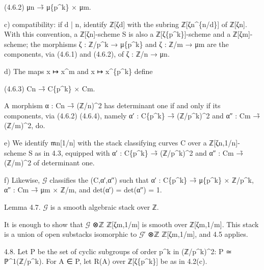 \documentclass[11pt,a4paper]{article}
\begin{document}
(4.6.2)        μ\textunderscore{}n →̃ μ\textunderscore{}\{p\textasciicircum{}k\} × μ\textunderscore{}m.

c) compatibility: if d | n, identify ℤ[ζ\textunderscore{}d] with the subring ℤ[ζ\textunderscore{}n\textasciicircum{}\{n/d\}] of ℤ[ζ\textunderscore{}n]. With this convention, a ℤ[ζ\textunderscore{}n]-scheme S is also a ℤ[ζ\textunderscore{}\{p\textasciicircum{}k\}]-scheme and a ℤ[ζ\textunderscore{}m]-scheme; the morphisms ζ : ℤ/p\textasciicircum{}k → μ\textunderscore{}\{p\textasciicircum{}k\} and ζ : ℤ/m → μ\textunderscore{}m are the components, via (4.6.1) and (4.6.2), of ζ : ℤ/n → μ\textunderscore{}n.

d) The maps x ↦ x\textasciicircum{}m and x ↦ x\textasciicircum{}\{p\textasciicircum{}k\} define

(4.6.3)        C\textunderscore{}n →̃ C\textunderscore{}\{p\textasciicircum{}k\} × C\textunderscore{}m.

A morphism α : C\textunderscore{}n →̃ (ℤ/n)\textasciicircum{}2 has determinant one if and only if its components, via (4.6.2) (4.6.4), namely α′ : C\textunderscore{}\{p\textasciicircum{}k\} →̃ (ℤ/p\textasciicircum{}k)\textasciicircum{}2 and α″ : C\textunderscore{}m →̃ (ℤ/m)\textasciicircum{}2, do.

e) We identify \ensuremath{\mathfrak{m}}\textunderscore{}n[1/n] with the stack classifying curves C over a ℤ[ζ\textunderscore{}n,1/n]-scheme S as in 4.3, equipped with α′ : C\textunderscore{}\{p\textasciicircum{}k\} →̃ (ℤ/p\textasciicircum{}k)\textasciicircum{}2 and α″ : C\textunderscore{}m →̃ (ℤ/m)\textasciicircum{}2 of determinant one.

f) Likewise, \ensuremath{\mathcal{G}} classifies the (C,α′,α″) such that α′ : C\textunderscore{}\{p\textasciicircum{}k\} →̃ μ\textunderscore{}\{p\textasciicircum{}k\} × ℤ/p\textasciicircum{}k, α″ : C\textunderscore{}m →̃ μ\textunderscore{}m × ℤ/m, and det(α′) = det(α″) = 1.

Lemma 4.7. \ensuremath{\mathcal{G}} is a smooth algebraic stack over ℤ.

It is enough to show that \ensuremath{\mathcal{G}} ⊗\textunderscore{}ℤ ℤ[ζ\textunderscore{}m,1/m] is smooth over ℤ[ζ\textunderscore{}m,1/m]. This stack is a union of open substacks isomorphic to \ensuremath{\mathcal{G}}′ ⊗\textunderscore{}ℤ ℤ[ζ\textunderscore{}m,1/m], and 4.5 applies.

4.8. Let P be the set of cyclic subgroups of order p\textasciicircum{}k in (ℤ/p\textasciicircum{}k)\textasciicircum{}2: P ≃ ℙ\textasciicircum{}1(ℤ/p\textasciicircum{}k). For A ∈ P, let R(A) over ℤ[ζ\textunderscore{}\{p\textasciicircum{}k\}] be as in 4.2(c).
\end{document}
